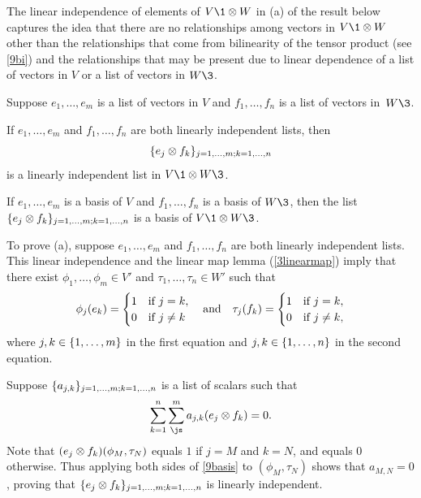The linear independence of elements of $V\1 \tensor W$ in (a) of the result below captures the idea that there are no relationships among vectors in $V\1 \tensor W$ other than the relationships that come from bilinearity of the tensor product (see \ref{9bi}) and the relationships that may be present due to linear dependence of a list of vectors in $V$ or a list of vectors in $W\3$.

{Suppose $e_1, \ldots, e_m$ is a list of vectors in $V$ and $f_1, \ldots, f_n$ is a list of vectors in~$W\3$.
\begin{subtheorem}
\item
If $e_1, \ldots, e_m$ and $f_1, \ldots, f_n$ are both linearly independent lists, then
\[
\{e_j \otimes f_k\}_{j = 1, \ldots, m; k = 1, \ldots, n}
\]
is a linearly independent list in $V\1 \tensor W\3$.
\item
If $e_1, \ldots, e_m$ is a basis of $V$ and $f_1, \ldots, f_n$ is a basis of $W\3$, then the list
$
\{e_j \otimes f_k\}_{j = 1, \ldots, m; k = 1, \ldots, n}$
is a basis of $V\1 \tensor W\3$.
\end{subtheorem}}

\proof
To prove (a), suppose $e_1, \ldots, e_m$ and $f_1, \ldots, f_n$ are both linearly independent lists. This linear independence and the linear map lemma (\ref{3linearmap}) imply that there exist $\phi_1, \ldots, \phi_m \in V'$ and $\tau_1, \ldots, \tau_n \in W'$ such that
\vspace{-.02in} %
\[
\phi_j(e_k) = \begin{cases}
1 & \text{if } j = k,\\
0 & \text{if } j \ne k
\end{cases}
\andd
\tau_j(f_k) = \begin{cases}
1 & \text{if } j = k,\\
0 & \text{if } j \ne k,
\end{cases}
\vspace{-.02in} %
\]
where $j, k \in \{1, \ldots, m\}$ in the first equation and $j, k \in \{1, \ldots, n\}$ in the second equation.

Suppose $\{a_{j,k}\}_{j = 1, \ldots, m; k = 1, \ldots, n}$ is a list of scalars such that
\vspace{-.04in} %
\begin{equation} \label{9basis}
\sum_{k=1}^n \sum_{\js}^m a_{j,k} (e_j \tensor f_k) = 0.
\vspace{-.04in} %
\end{equation}%
Note that $(e_j \otimes f_k)(\phi_M, \tau_N)$ equals $1$ if $j=M$ and $k = N$, and equals $0$ otherwise. Thus applying both sides of \ref{9basis} to $(\phi_M, \tau_N)$ shows that $a_{M,N} = 0$, proving that
$\{e_j \otimes f_k\}_{j = 1, \ldots, m; k = 1, \ldots, n}$ is linearly independent.

